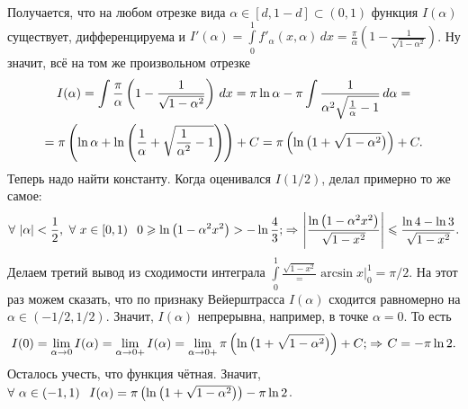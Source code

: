 \documentclass{article}
\begin{document}
\begin{enumerate}
\begin{enumerate}
Получается, что на любом отрезке вида $\alpha\in[d,1-d]\subset (0,1)$ функция $I(\alpha)$ существует, дифференцируема и $I'(\alpha)=\int\limits_0^1f'_{\alpha}(x,\alpha)\,dx=\frac{\pi}{\alpha}\left(1-\frac1{\sqrt{1-\alpha^2}}\right)$. Ну значит, всё на том же произвольном отрезке 
\begin{multline*}I(\alpha)\hm=\int\frac{\pi}{\alpha}\left(1-\frac1{\sqrt{1-\alpha^2}}\right)\,dx=\pi\ln\alpha-\pi\int\frac1{\alpha^2\sqrt{\frac1{\alpha}-1}}\,d\alpha=\\
=\pi\left(\ln\alpha+\ln\left(\frac1{\alpha}+\sqrt{\frac1{\alpha^2}-1}\right)\right)+C=\pi\left(\ln\big(1+\sqrt{1-\alpha^2}\big)\right)+C.\end{multline*}
Теперь надо найти константу. Когда оценивался $I(1/2)$, делал примерно то же самое: \[\forall\ |\alpha|<\frac12,\ \forall\ x\in[0,1)\pau 0\ge\ln\left(1-\alpha^2x^2\right)>-\ln\frac43;\imp \left|\frac{\ln\left(1-\alpha^2x^2\right)}{\sqrt{1-x^2}}\right|\le\frac{\ln4-\ln3}{\sqrt{1-x^2}}.\]
Делаем третий вывод из сходимости интеграла $\int\limits_0^1\frac{\sqrt{1-x^2}}=\arcsin x\Big|_0^1=\pi/2$. На этот раз можем сказать, что по признаку Вейерштрасса $I(\alpha)$ сходится равномерно на $\alpha\in(-1/2,1/2)$. Значит, $I(\alpha)$ непрерывна, например, в точке $\alpha=0$. То есть \[I(0)=\lim\limits_{\alpha\rightarrow0}I(\alpha)=\lim\limits_{\alpha\rightarrow0+}I(\alpha)=\lim\limits_{\alpha\rightarrow0+}\pi\left(\ln\big(1+\sqrt{1-\alpha^2}\big)\right)+C; \hspace{1pt plus1pt}\Rightarrow\hspace{1pt plus1pt} C=-\pi\ln2.\]
Осталось учесть, что функция чётная. Значит, $\forall\ \alpha\in(-1,1)\hskip .75em plus.1em minus.08em\relax I(\alpha)=\pi\left(\ln\big(1+\sqrt{1-\alpha^2}\big)\right)-\pi\ln2$.
\end{enumerate}
\end{enumerate}
\end{document}
